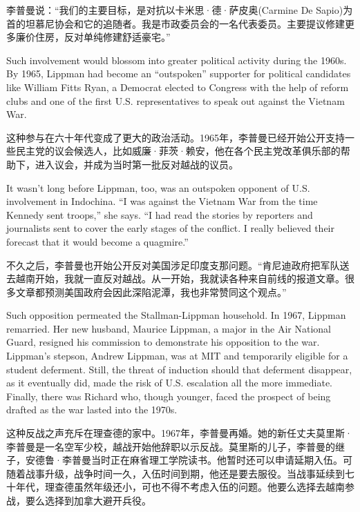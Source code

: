 \ifdefined\chs
李普曼说：“我们的主要目标，是对抗以卡米思·德·萨皮奥(Carmine De Sapio)为首的坦慕尼协会和它的追随者。我是市政委员会的一名代表委员。主要提议修建更多廉价住房，反对单纯修建舒适豪宅。”
\fi

\ifdefined\eng
Such involvement would blossom into greater political activity during the 1960s. By 1965, Lippman had become an ``outspoken'' supporter for political candidates like William Fitts Ryan, a Democrat elected to Congress with the help of reform clubs and one of the first U.S. representatives to speak out against the Vietnam War.
\fi

\ifdefined\chs
这种参与在六十年代变成了更大的政治活动。1965年，李普曼已经开始公开支持一些民主党的议会候选人，比如威廉·菲茨·赖安，他在各个民主党改革俱乐部的帮助下，进入议会，并成为当时第一批反对越战的议员。
\fi

\ifdefined\eng
It wasn't long before Lippman, too, was an outspoken opponent of U.S. involvement in Indochina. ``I was against the Vietnam War from the time Kennedy sent troops,'' she says. ``I had read the stories by reporters and journalists sent to cover the early stages of the conflict. I really believed their forecast that it would become a quagmire.''
\fi

\ifdefined\chs
不久之后，李普曼也开始公开反对美国涉足印度支那问题。“肯尼迪政府把军队送去越南开始，我就一直反对越战。从一开始，我就读各种来自前线的报道文章。很多文章都预测美国政府会因此深陷泥潭，我也非常赞同这个观点。”
\fi

\ifdefined\eng
Such opposition permeated the Stallman-Lippman household. In 1967, Lippman remarried. Her new husband, Maurice Lippman, a major in the Air National Guard, resigned his commission to demonstrate his opposition to the war. Lippman's stepson, Andrew Lippman, was at MIT and temporarily eligible for a student deferment. Still, the threat of induction should that deferment disappear, as it eventually did, made the risk of U.S. escalation all the more immediate. Finally, there was Richard who, though younger, faced the prospect of being drafted as the war lasted into the 1970s.
\fi

\ifdefined\chs
这种反战之声充斥在理查德的家中。1967年，李普曼再婚。她的新任丈夫莫里斯·李普曼是一名空军少校，越战开始他辞职以示反战。莫里斯的儿子，李普曼的继子，安德鲁·李普曼当时正在麻省理工学院读书。他暂时还可以申请延期入伍。可随着战事升级，战争时间一久，入伍时间到期，他还是要去服役。当战事延续到七十年代，理查德虽然年级还小，可也不得不考虑入伍的问题。他要么选择去越南参战，要么选择到加拿大避开兵役。
\fi


